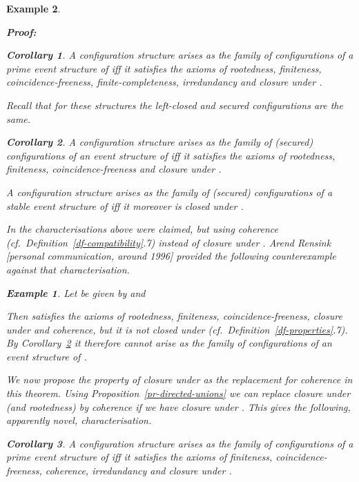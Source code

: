 \documentclass[twocolumn]{article}
\newtheorem{coro}{Corollary}
\newtheorem{exam}{Example}
\newenvironment{corollary}[1]{\begin{coro} \rm \label{cor-#1} }{\end{coro}}
\newenvironment{example}[1]{\begin{exam} \rm \label{ex-#1} }{\end{exam}}
\newenvironment{proof}{\begin{trivlist} \item[\hspace{\labelsep}\bf
Proof:]}{\hfill \end{trivlist}}
\newcommand{\df}[1]{Definition~\ref{df-#1}}
\newcommand{\pr}[1]{Proposition~\ref{pr-#1}}
\newcommand{\cor}[1]{Corollary~\ref{cor-#1}}
\begin{document}
\begin{example}{causality}
\begin{proof}
\begin{corollary}{characterisation-prime-Wi87a}
A configuration structure arises as the family of configurations of a
prime event structure of \cite{Wi87a} iff it satisfies
the axioms of rootedness, finiteness, coincidence-freeness,
finite-completeness, irredundancy and closure under .
\hfill 
\end{corollary}
Recall that for these structures the left-closed and secured
configurations are the same.

\begin{corollary}{characterisation-Wi89}
A configuration structure arises as the family of (secured)
configurations of an event structure of \cite{Wi89} iff it satisfies
the axioms of rootedness, finiteness, coincidence-freeness and
closure under .

A configuration structure arises as the family of (secured)
configurations of a stable event structure of \cite{Wi89} iff it
moreover is closed under .
\hfill 
\end{corollary}
In \cite{Wi87a} the characterisations above were claimed, but using
coherence (cf.\ \df{compatibility}.7) instead of closure under
.  Arend Rensink [personal communication, around
1996] provided the following counterexample against that characterisation.

\begin{example}{Rensink}
Let  be given by  and\vspace{-1.4ex}

Then  satisfies the axioms of rootedness, finiteness,
coincidence-freeness, closure under  and coherence, but it
is not closed under  (cf.\ \df{properties}.7). By
\cor{characterisation-Wi89} it therefore cannot arise as the family of
configurations of an event structure of \cite{Wi89}.
\end{example}
We now propose the property of closure under  as the
replacement for coherence in this theorem. Using
\pr{directed-unions} we can replace closure under  (and
rootedness) by coherence if we have closure under .
This gives the following, apparently novel, characterisation.

\begin{corollary}{characterisation-prime-Wi89}
A configuration structure arises as the family of configurations of a
prime event structure of \cite{Wi89} iff it satisfies the axioms of
finiteness, coincidence-freeness, coherence, irredundancy and closure
under .
\hfill 
\end{corollary}


\end{proof}
\end{example}
\end{document}
